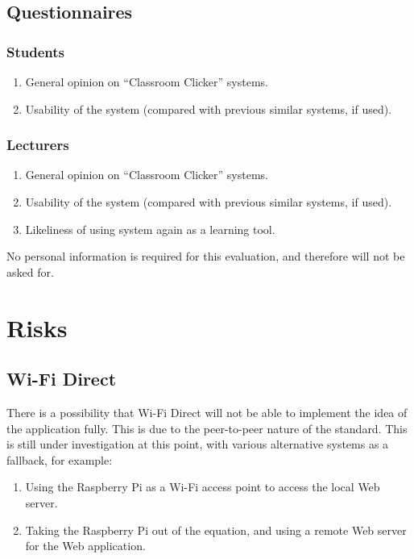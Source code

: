 \documentclass{article}
\begin{document}
\subsection{Questionnaires}
\subsubsection{Students}
\begin{enumerate}
	\item General opinion on ``Classroom Clicker'' systems.
	\item Usability of the system (compared with previous similar systems, if used).
\end{enumerate}

\subsubsection{Lecturers}
\begin{enumerate}
	\item General opinion on ``Classroom Clicker'' systems.
	\item Usability of the system (compared with previous similar systems, if used).
	\item Likeliness of using system again as a learning tool.
\end{enumerate}
No personal information is required for this evaluation, and therefore will not be asked for.

\section{Risks}
\subsection{Wi-Fi Direct}
There is a possibility that Wi-Fi Direct will not be able to implement the idea of the application fully. This is due to the peer-to-peer nature of the standard. This is still under investigation at this point, with various alternative systems as a fallback, for example:
\begin{enumerate}
	\item Using the Raspberry Pi as a Wi-Fi access point to access the local Web server.
	\item Taking the Raspberry Pi out of the equation, and using a remote Web server for the Web application.
\end{enumerate}
\end{document}
